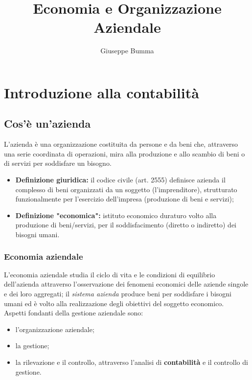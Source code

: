 \documentclass{article}
\title{Economia e Organizzazione Aziendale}
\author{Giuseppe Bumma}
\begin{document}
\newcommand{\R}{\mathbb{R}}
\newcommand{\bb}[1]{\mathbb{#1}}
\newcommand{\cc}[1]{\mathcal{#1}}
\newcommand{ \lognormal }{\text{Lognormal} }
\newcommand{\tb}[1]{\textbf{#1}}
\newcommand*\circled[1]{\tikz[baseline=(char.base)]{%
            \node[shape=circle,draw,inner sep=2pt] (char) {#1};}}


\tableofcontents

\maketitle

\section{Introduzione alla contabilità}
\subsection{Cos'è un'azienda}
L'azienda è una organizzazione costituita da persone e da beni che, attraverso
una serie coordinata di operazioni, mira alla produzione e allo scambio di beni o
di servizi per soddisfare un bisogno.
\begin{itemize}
    \item \textbf{Definizione giuridica:} il codice civile (art. 2555) definisce azienda il complesso di beni
    organizzati da un soggetto (l'imprenditore), strutturato funzionalmente per
    l'esercizio dell'impresa (produzione di beni e servizi);
    \item \textbf{Definizione "economica":} istituto economico duraturo volto alla produzione di
    beni/servizi, per il soddisfacimento (diretto o indiretto) dei bisogni umani.
\end{itemize}


\subsubsection{Economia aziendale}
L'economia aziendale studia il ciclo
di vita e le condizioni di equilibrio
dell'azienda attraverso l'osservazione
dei fenomeni economici delle
aziende singole e dei loro aggregati; il \textit{sistema azienda} produce beni
per soddisfare i bisogni umani ed è
volto alla realizzazione degli obiettivi
del soggetto economico.
\vspace*{0.2cm}\\
Aspetti fondanti della gestione aziendale sono:
\begin{itemize}
    \item l'organizzazione aziendale;
    \item la gestione;
    \item la rilevazione e il controllo, attraverso l'analisi di \textbf{contabilità} e il controllo di gestione.
\end{itemize}
\end{document}
